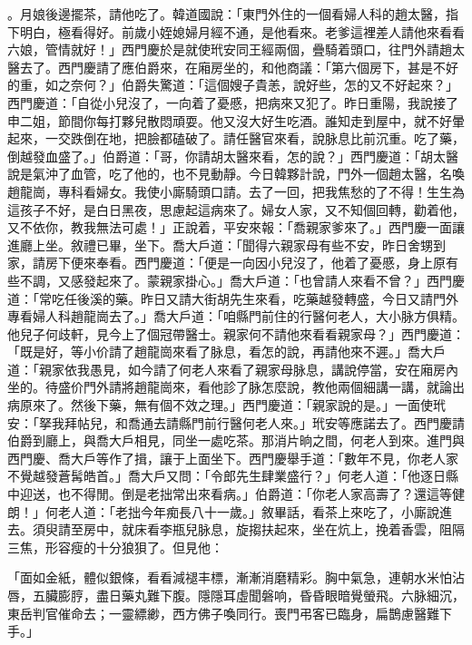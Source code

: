 \begin{showcontents}{}
。月娘後邊擺茶，請他吃了。韓道國說：「東門外住的一個看婦人科的趙太醫，指下明白，極看得好。前歲小姪媳婦月經不通，是他看來。老爹這裡差人請他來看看六娘，管情就好！」西門慶於是就使玳安同王經兩個，疊騎着頭口，往門外請趙太醫去了。西門慶請了應伯爵來，在廂房坐的，和他商議：「第六個房下，甚是不好的重，如之奈何？」伯爵失驚道：「這個嫂子貴恙，說好些，怎的又不好起來？」西門慶道：「自從小兒沒了，一向着了憂慼，把病來又犯了。昨日重陽，我說接了申二姐，節間你每打夥兒散悶頑耍。他又沒大好生吃酒。誰知走到屋中，就不好暈起來，一交跌倒在地，把臉都磕破了。請任醫官來看，說脉息比前沉重。吃了藥，倒越發血盛了。」伯爵道：「哥，你請胡太醫來看，怎的說？」西門慶道：「胡太醫說是氣沖了血管，吃了他的，也不見動靜。今日韓夥計說，門外一個趙太醫，名喚趙龍崗，專科看婦女。我使小廝騎頭口請。去了一回，把我焦愁的了不得！生生為這孩子不好，是白日黑夜，思慮起這病來了。婦女人家，又不知個回轉，勸着他，又不依你，教我無法可處！」正說着，平安來報：「喬親家爹來了。」西門慶一面讓進廳上坐。敘禮已畢，坐下。喬大戶道：「聞得六親家母有些不安，昨日舍甥到家，請房下便來奉看。西門慶道：「便是一向因小兒沒了，他着了憂慼，身上原有些不調，又感發起來了。蒙親家掛心。」喬大戶道：「也曾請人來看不曾？」西門慶道：「常吃任後溪的藥。昨日又請大街胡先生來看，吃藥越發轉盛，今日又請門外專看婦人科趙龍崗去了。」喬大戶道：「咱縣門前住的行醫何老人，大小脉方俱精。他兒子何歧軒，見今上了個冠帶醫士。親家何不請他來看看親家母？」西門慶道：「既是好，等小价請了趙龍崗來看了脉息，看怎的說，再請他來不遲。」喬大戶道：「親家依我愚見，如今請了何老人來看了親家母脉息，講說停當，安在廂房內坐的。待盛价門外請將趙龍崗來，看他診了脉怎麼說，教他兩個細講一講，就論出病原來了。然後下藥，無有個不效之理。」西門慶道：「親家說的是。」一面使玳安：「拏我拜帖兒，和喬通去請縣門前行醫何老人來。」玳安等應諾去了。西門慶請伯爵到廳上，與喬大戶相見，同坐一處吃茶。那消片晌之間，何老人到來。進門與西門慶、喬大戶等作了揖，讓于上面坐下。西門慶舉手道：「數年不見，你老人家不覺越發蒼髯皓首。」喬大戶又問：「令郎先生肆業盛行？」何老人道：「他逐日縣中迎送，也不得閒。倒是老拙常出來看病。」伯爵道：「你老人家高壽了？還這等健朗！」何老人道：「老拙今年痴長八十一歲。」敘畢話，看茶上來吃了，小廝說進去。須臾請至房中，就床看李瓶兒脉息，旋搊扶起來，坐在炕上，挽着香雲，阻隔三焦，形容瘦的十分狼狽了。但見他：

「面如金紙，體似銀條，看看減褪丰標，漸漸消磨精彩。胸中氣急，連朝水米怕沾唇，五臟膨脝，盡日藥丸難下腹。隱隱耳虛聞磐响，昏昏眼暗覺螢飛。六脉細沉，東岳判官催命去；一靈縹緲，西方佛子喚同行。喪門弔客已臨身，扁鵲慮醫難下手。」


\end{showcontents}
